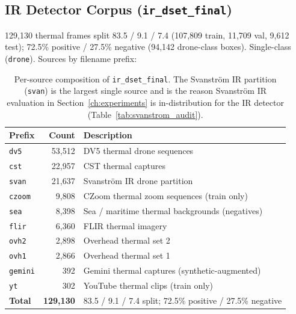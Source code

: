 \subsection{IR Detector Corpus (\texttt{ir\_dset\_final})}
\label{sec:ds_ir}

129{,}130 thermal frames split 83.5 / 9.1 / 7.4 (107{,}809 train, 11{,}709 val, 9{,}612 test); 72.5\% positive / 27.5\% negative (94{,}142 drone-class boxes). Single-class (\texttt{drone}). Sources by filename prefix:

\begin{table}[htbp]
    \centering
    \caption{Per-source composition of \texttt{ir\_dset\_final}. The Svanstr\"om IR partition (\texttt{svan}) is the largest single source and is the reason Svanstr\"om IR evaluation in Section~\ref{ch:experiments} is in-distribution for the IR detector (Table~\ref{tab:svanstrom_audit}).}
    \label{tab:ds_ir_components}
    \begin{tabular}{lrp{7.2cm}}
        \toprule
        Prefix & Count & Description \\
        \midrule
        \texttt{dv5}    & 53{,}512 & DV5 thermal drone sequences \\
        \texttt{cst}    & 22{,}957 & CST thermal captures \\
        \texttt{svan}   & 21{,}637 & Svanstr\"om IR drone partition \\
        \texttt{czoom}  &  9{,}808 & CZoom thermal zoom sequences (train only) \\
        \texttt{sea}    &  8{,}398 & Sea / maritime thermal backgrounds (negatives) \\
        \texttt{flir}   &  6{,}360 & FLIR thermal imagery \\
        \texttt{ovh2}   &  2{,}898 & Overhead thermal set 2 \\
        \texttt{ovh1}   &  2{,}866 & Overhead thermal set 1 \\
        \texttt{gemini} &     392 & Gemini thermal captures (synthetic-augmented) \\
        \texttt{yt}     &     302 & YouTube thermal clips (train only) \\
        \midrule
        \textbf{Total}  & \textbf{129{,}130} & 83.5 / 9.1 / 7.4 split; 72.5\% positive / 27.5\% negative \\
        \bottomrule
    \end{tabular}
\end{table}

